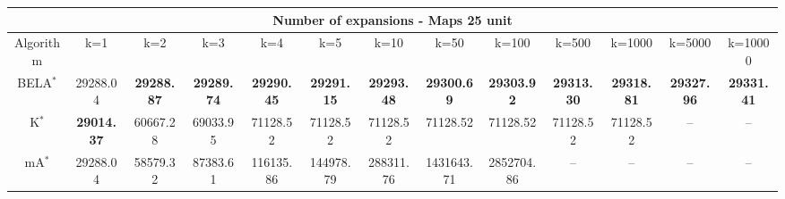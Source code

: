 \begin{tabular}{c|cccccccccccc}\toprule
\multicolumn{13}{c}{Number of expansions - Maps 25 unit}\\ \midrule
Algorithm & k=1 & k=2 & k=3 & k=4 & k=5 & k=10 & k=50 & k=100 & k=500 & k=1000 & k=5000 & k=10000 \\ \midrule
BELA$^*$ & 29288.04 & \textbf{29288.87} & \textbf{29289.74} & \textbf{29290.45} & \textbf{29291.15} & \textbf{29293.48} & \textbf{29300.69} & \textbf{29303.92} & \textbf{29313.30} & \textbf{29318.81} & \textbf{29327.96} & \textbf{29331.41} \\
K$^*$ & \textbf{29014.37} & 60667.28 & 69033.95 & 71128.52 & 71128.52 & 71128.52 & 71128.52 & 71128.52 & 71128.52 & 71128.52 & -- & -- \\
mA$^*$ & 29288.04 & 58579.32 & 87383.61 & 116135.86 & 144978.79 & 288311.76 & 1431643.71 & 2852704.86 & -- & -- & -- & -- \\ \bottomrule 
\end{tabular}
